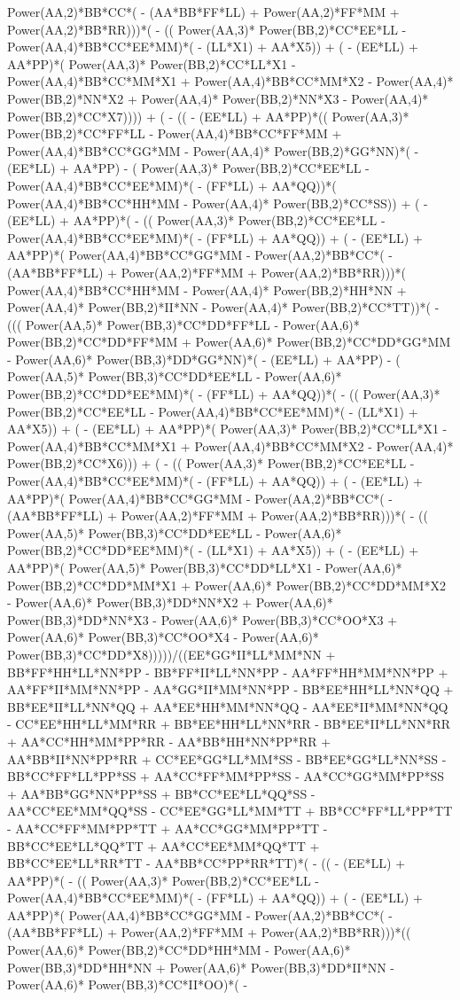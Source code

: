 \documentclass[10pt]{article} %
\begin{document}
Power(AA,2)*BB*CC*( - (AA*BB*FF*LL) +  Power(AA,2)*FF*MM +  Power(AA,2)*BB*RR)))*( - (( Power(AA,3)* Power(BB,2)*CC*EE*LL -  Power(AA,4)*BB*CC*EE*MM)*( - (LL*X1) + AA*X5)) + ( - (EE*LL) + AA*PP)*( Power(AA,3)* Power(BB,2)*CC*LL*X1 -  Power(AA,4)*BB*CC*MM*X1 +  Power(AA,4)*BB*CC*MM*X2 -  Power(AA,4)* Power(BB,2)*NN*X2 +  Power(AA,4)* Power(BB,2)*NN*X3 -  Power(AA,4)* Power(BB,2)*CC*X7)))) + ( - (( - (EE*LL) + AA*PP)*(( Power(AA,3)* Power(BB,2)*CC*FF*LL -  Power(AA,4)*BB*CC*FF*MM +  Power(AA,4)*BB*CC*GG*MM -  Power(AA,4)* Power(BB,2)*GG*NN)*( - (EE*LL) + AA*PP) - ( Power(AA,3)* Power(BB,2)*CC*EE*LL -  Power(AA,4)*BB*CC*EE*MM)*( - (FF*LL) + AA*QQ))*( Power(AA,4)*BB*CC*HH*MM -  Power(AA,4)* Power(BB,2)*CC*SS)) + ( - (EE*LL) + AA*PP)*( - (( Power(AA,3)* Power(BB,2)*CC*EE*LL -  Power(AA,4)*BB*CC*EE*MM)*( - (FF*LL) + AA*QQ)) + ( - (EE*LL) + AA*PP)*( Power(AA,4)*BB*CC*GG*MM -  Power(AA,2)*BB*CC*( - (AA*BB*FF*LL) +  Power(AA,2)*FF*MM +  Power(AA,2)*BB*RR)))*( Power(AA,4)*BB*CC*HH*MM -  Power(AA,4)* Power(BB,2)*HH*NN +  Power(AA,4)* Power(BB,2)*II*NN -  Power(AA,4)* Power(BB,2)*CC*TT))*( - ((( Power(AA,5)* Power(BB,3)*CC*DD*FF*LL -  Power(AA,6)* Power(BB,2)*CC*DD*FF*MM +  Power(AA,6)* Power(BB,2)*CC*DD*GG*MM -  Power(AA,6)* Power(BB,3)*DD*GG*NN)*( - (EE*LL) + AA*PP) - ( Power(AA,5)* Power(BB,3)*CC*DD*EE*LL -  Power(AA,6)* Power(BB,2)*CC*DD*EE*MM)*( - (FF*LL) + AA*QQ))*( - (( Power(AA,3)* Power(BB,2)*CC*EE*LL -  Power(AA,4)*BB*CC*EE*MM)*( - (LL*X1) + AA*X5)) + ( - (EE*LL) + AA*PP)*( Power(AA,3)* Power(BB,2)*CC*LL*X1 -  Power(AA,4)*BB*CC*MM*X1 +  Power(AA,4)*BB*CC*MM*X2 -  Power(AA,4)* Power(BB,2)*CC*X6))) + ( - (( Power(AA,3)* Power(BB,2)*CC*EE*LL -  Power(AA,4)*BB*CC*EE*MM)*( - (FF*LL) + AA*QQ)) + ( - (EE*LL) + AA*PP)*( Power(AA,4)*BB*CC*GG*MM -  Power(AA,2)*BB*CC*( - (AA*BB*FF*LL) +  Power(AA,2)*FF*MM +  Power(AA,2)*BB*RR)))*( - (( Power(AA,5)* Power(BB,3)*CC*DD*EE*LL -  Power(AA,6)* Power(BB,2)*CC*DD*EE*MM)*( - (LL*X1) + AA*X5)) + ( - (EE*LL) + AA*PP)*( Power(AA,5)* Power(BB,3)*CC*DD*LL*X1 -  Power(AA,6)* Power(BB,2)*CC*DD*MM*X1 +  Power(AA,6)* Power(BB,2)*CC*DD*MM*X2 -  Power(AA,6)* Power(BB,3)*DD*NN*X2 +  Power(AA,6)* Power(BB,3)*DD*NN*X3 -  Power(AA,6)* Power(BB,3)*CC*OO*X3 +  Power(AA,6)* Power(BB,3)*CC*OO*X4 -  Power(AA,6)* Power(BB,3)*CC*DD*X8)))))/((EE*GG*II*LL*MM*NN + BB*FF*HH*LL*NN*PP - BB*FF*II*LL*NN*PP - AA*FF*HH*MM*NN*PP + AA*FF*II*MM*NN*PP - AA*GG*II*MM*NN*PP - BB*EE*HH*LL*NN*QQ + BB*EE*II*LL*NN*QQ + AA*EE*HH*MM*NN*QQ - AA*EE*II*MM*NN*QQ - CC*EE*HH*LL*MM*RR + BB*EE*HH*LL*NN*RR - BB*EE*II*LL*NN*RR + AA*CC*HH*MM*PP*RR - AA*BB*HH*NN*PP*RR + AA*BB*II*NN*PP*RR + CC*EE*GG*LL*MM*SS - BB*EE*GG*LL*NN*SS - BB*CC*FF*LL*PP*SS + AA*CC*FF*MM*PP*SS - AA*CC*GG*MM*PP*SS + AA*BB*GG*NN*PP*SS + BB*CC*EE*LL*QQ*SS - AA*CC*EE*MM*QQ*SS - CC*EE*GG*LL*MM*TT + BB*CC*FF*LL*PP*TT - AA*CC*FF*MM*PP*TT + AA*CC*GG*MM*PP*TT - BB*CC*EE*LL*QQ*TT + AA*CC*EE*MM*QQ*TT + BB*CC*EE*LL*RR*TT - AA*BB*CC*PP*RR*TT)*( - (( - (EE*LL) + AA*PP)*( - (( Power(AA,3)* Power(BB,2)*CC*EE*LL -  Power(AA,4)*BB*CC*EE*MM)*( - (FF*LL) + AA*QQ)) + ( - (EE*LL) + AA*PP)*( Power(AA,4)*BB*CC*GG*MM -  Power(AA,2)*BB*CC*( - (AA*BB*FF*LL) +  Power(AA,2)*FF*MM +  Power(AA,2)*BB*RR)))*(( Power(AA,6)* Power(BB,2)*CC*DD*HH*MM -  Power(AA,6)* Power(BB,3)*DD*HH*NN +  Power(AA,6)* Power(BB,3)*DD*II*NN -  Power(AA,6)* Power(BB,3)*CC*II*OO)*( - 
\end{document}
